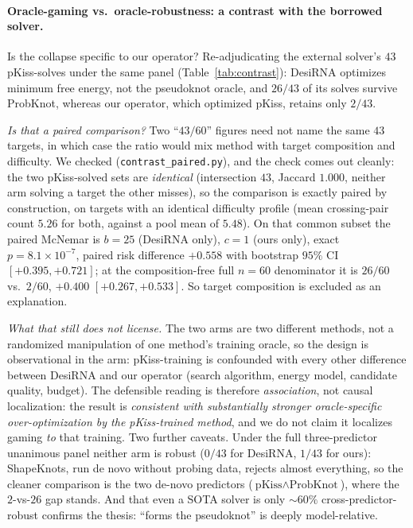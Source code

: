 \documentclass[11pt]{article}
\begin{document}
\paragraph{Oracle-gaming vs.\ oracle-robustness: a contrast with the borrowed solver.} Is the collapse
specific to our operator? Re-adjudicating the external solver's $43$ pKiss-solves under the same panel
(Table~\ref{tab:contrast}): DesiRNA optimizes minimum free energy, not the pseudoknot oracle, and $26/43$ of
its solves survive ProbKnot, whereas our operator, which optimized pKiss, retains only $2/43$.

\emph{Is that a paired comparison?} Two ``$43/60$'' figures need not name the same $43$ targets, in which case
the ratio would mix method with target composition and difficulty. We checked (\texttt{contrast\_paired.py}), and the check comes out cleanly: the two pKiss-solved sets are
\emph{identical} (intersection $43$, Jaccard $1.000$, neither arm solving a target the other misses), so the
comparison is exactly paired by construction, on targets with an identical difficulty profile (mean crossing-pair
count $5.26$ for both, against a pool mean of $5.48$). On that common subset the paired McNemar is
$b{=}25$ (DesiRNA only), $c{=}1$ (ours only), exact $p{=}8.1\!\times\!10^{-7}$, paired risk difference
${+}0.558$ with bootstrap $95\%$ CI $[{+}0.395,{+}0.721]$; at the composition-free full $n{=}60$ denominator it
is $26/60$ vs.\ $2/60$, ${+}0.400$ $[{+}0.267,{+}0.533]$. So target composition is excluded as an explanation.

\emph{What that still does not license.} The two arms are two different methods, not a randomized
manipulation of one method's training oracle, so the design is observational in the arm: pKiss-training is
confounded with every other difference between DesiRNA and our operator (search algorithm, energy model,
candidate quality, budget). The defensible reading is therefore \emph{association}, not causal localization:
the result is \emph{consistent with substantially stronger oracle-specific over-optimization by the
pKiss-trained method}, and we do not claim it localizes gaming \emph{to} that training. Two further caveats.
Under the full three-predictor unanimous panel neither arm is robust ($0/43$
for DesiRNA, $1/43$ for ours): ShapeKnots, run de novo without probing data, rejects almost everything, so
the cleaner comparison is the two de-novo predictors ($\text{pKiss}\wedge\text{ProbKnot}$), where the
$2$-vs-$26$ gap stands. And that even a SOTA solver is only $\sim\!60\%$ cross-predictor-robust confirms the
thesis: ``forms the pseudoknot'' is deeply model-relative.
\end{document}
